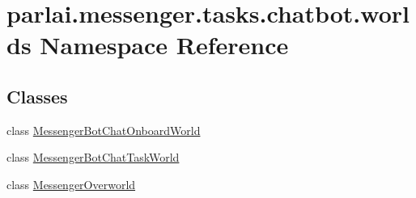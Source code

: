 \hypertarget{namespaceparlai_1_1messenger_1_1tasks_1_1chatbot_1_1worlds}{}\section{parlai.\+messenger.\+tasks.\+chatbot.\+worlds Namespace Reference}
\label{namespaceparlai_1_1messenger_1_1tasks_1_1chatbot_1_1worlds}
\subsection*{Classes}
\begin{DoxyCompactItemize}
\item 
class \hyperlink{classparlai_1_1messenger_1_1tasks_1_1chatbot_1_1worlds_1_1MessengerBotChatOnboardWorld}{Messenger\+Bot\+Chat\+Onboard\+World}
\item 
class \hyperlink{classparlai_1_1messenger_1_1tasks_1_1chatbot_1_1worlds_1_1MessengerBotChatTaskWorld}{Messenger\+Bot\+Chat\+Task\+World}
\item 
class \hyperlink{classparlai_1_1messenger_1_1tasks_1_1chatbot_1_1worlds_1_1MessengerOverworld}{Messenger\+Overworld}
\end{DoxyCompactItemize}
